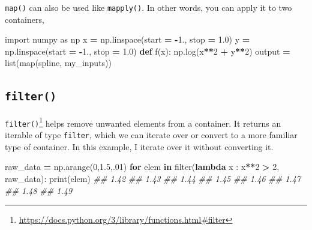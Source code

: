 \documentclass[
  12pt,
]{krantz}
\makeatletter
\newenvironment{Shaded}{\begin{snugshade}}{\end{snugshade}}
\newcommand{\BuiltInTok}[1]{#1}
\newcommand{\CommentTok}[1]{\textcolor[rgb]{0.37,0.37,0.37}{\textit{#1}}}
\newcommand{\ControlFlowTok}[1]{\textcolor[rgb]{0.27,0.27,0.27}{\textbf{#1}}}
\newcommand{\DecValTok}[1]{\textcolor[rgb]{0.06,0.06,0.06}{#1}}
\newcommand{\FloatTok}[1]{\textcolor[rgb]{0.06,0.06,0.06}{#1}}
\newcommand{\ImportTok}[1]{#1}
\newcommand{\KeywordTok}[1]{\textcolor[rgb]{0.27,0.27,0.27}{\textbf{#1}}}
\newcommand{\NormalTok}[1]{#1}
\newcommand{\OperatorTok}[1]{\textcolor[rgb]{0.43,0.43,0.43}{\textbf{#1}}}
\renewcommand{\href}[2]{#2\footnote{\url{#1}}}
\newenvironment{kframe}{%
\medskip{}
\setlength{\fboxsep}{.8em}
 \def\at@end@of@kframe{}%
 \ifinner\ifhmode%
  \def\at@end@of@kframe{\end{minipage}}%
  \begin{minipage}{\columnwidth}%
 \fi\fi%
 \def\FrameCommand##1{\hskip\@totalleftmargin \hskip-\fboxsep
 \colorbox{shadecolor}{##1}\hskip-\fboxsep
     \hskip-\linewidth \hskip-\@totalleftmargin \hskip\columnwidth}%
 \MakeFramed {\advance\hsize-\width
   \@totalleftmargin\z@ \linewidth\hsize
   \@setminipage}}%
 {\par\unskip\endMakeFramed%
 \at@end@of@kframe}
\renewenvironment{Shaded}{\begin{kframe}}{\end{kframe}}
\makeatother
\begin{document}
\texttt{map()} can also be used like \texttt{mapply()}. In other words, you can apply it to two containers,

\begin{Shaded}
\begin{Highlighting}[]
\ImportTok{import}\NormalTok{ numpy }\ImportTok{as}\NormalTok{ np}
\NormalTok{x }\OperatorTok{=}\NormalTok{ np.linspace(start }\OperatorTok{=} \OperatorTok{{-}}\FloatTok{1.}\NormalTok{, stop }\OperatorTok{=} \FloatTok{1.0}\NormalTok{)}
\NormalTok{y }\OperatorTok{=}\NormalTok{ np.linspace(start }\OperatorTok{=} \OperatorTok{{-}}\FloatTok{1.}\NormalTok{, stop }\OperatorTok{=} \FloatTok{1.0}\NormalTok{)}
\KeywordTok{def}\NormalTok{ f(x):}
\NormalTok{    np.log(x}\OperatorTok{**}\DecValTok{2} \OperatorTok{+}\NormalTok{ y}\OperatorTok{**}\DecValTok{2}\NormalTok{)}
\NormalTok{output }\OperatorTok{=} \BuiltInTok{list}\NormalTok{(}\BuiltInTok{map}\NormalTok{(spline, my\_inputs))}
\end{Highlighting}
\end{Shaded}

\hypertarget{filter}{%
\subsection{\texorpdfstring{\texttt{filter()}}{filter()}}\label{filter}}

\href{https://docs.python.org/3/library/functions.html\#filter}{\texttt{filter()}} helps remove unwanted elements from a container. It returns an iterable of type \texttt{filter}, which we can iterate over or convert to a more familiar type of container. In this example, I iterate over it without converting it.

\begin{Shaded}
\begin{Highlighting}[]
\NormalTok{raw\_data }\OperatorTok{=}\NormalTok{ np.arange(}\DecValTok{0}\NormalTok{,}\FloatTok{1.5}\NormalTok{,}\FloatTok{.01}\NormalTok{)}
\ControlFlowTok{for}\NormalTok{ elem }\KeywordTok{in} \BuiltInTok{filter}\NormalTok{(}\KeywordTok{lambda}\NormalTok{ x : x}\OperatorTok{**}\DecValTok{2} \OperatorTok{\textgreater{}} \DecValTok{2}\NormalTok{, raw\_data):}
    \BuiltInTok{print}\NormalTok{(elem)}
\CommentTok{\#\# 1.42}
\CommentTok{\#\# 1.43}
\CommentTok{\#\# 1.44}
\CommentTok{\#\# 1.45}
\CommentTok{\#\# 1.46}
\CommentTok{\#\# 1.47}
\CommentTok{\#\# 1.48}
\CommentTok{\#\# 1.49}
\end{Highlighting}
\end{Shaded}
\end{document}
